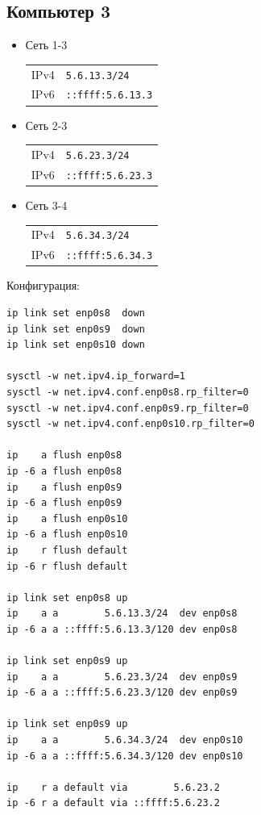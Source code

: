 \subsection{Компьютер 3}
\begin{itemize}
    \item Сеть 1-3

    \begin{tabular}{ll}
        IPv4 & \texttt{5.6.13.3/24}     \\
        IPv6 & \texttt{::ffff:5.6.13.3} \\
    \end{tabular}

    \item Сеть 2-3

    \begin{tabular}{ll}
        IPv4 & \texttt{5.6.23.3/24}     \\
        IPv6 & \texttt{::ffff:5.6.23.3} \\
    \end{tabular}

    \item Сеть 3-4

    \begin{tabular}{ll}
        IPv4 & \texttt{5.6.34.3/24}     \\
        IPv6 & \texttt{::ffff:5.6.34.3} \\
    \end{tabular}
\end{itemize}

Конфигурация:
\begin{verbatim}
ip link set enp0s8  down
ip link set enp0s9  down
ip link set enp0s10 down

sysctl -w net.ipv4.ip_forward=1
sysctl -w net.ipv4.conf.enp0s8.rp_filter=0
sysctl -w net.ipv4.conf.enp0s9.rp_filter=0
sysctl -w net.ipv4.conf.enp0s10.rp_filter=0

ip    a flush enp0s8
ip -6 a flush enp0s8
ip    a flush enp0s9
ip -6 a flush enp0s9
ip    a flush enp0s10
ip -6 a flush enp0s10
ip    r flush default
ip -6 r flush default

ip link set enp0s8 up
ip    a a        5.6.13.3/24  dev enp0s8
ip -6 a a ::ffff:5.6.13.3/120 dev enp0s8

ip link set enp0s9 up
ip    a a        5.6.23.3/24  dev enp0s9
ip -6 a a ::ffff:5.6.23.3/120 dev enp0s9

ip link set enp0s9 up
ip    a a        5.6.34.3/24  dev enp0s10
ip -6 a a ::ffff:5.6.34.3/120 dev enp0s10

ip    r a default via        5.6.23.2
ip -6 r a default via ::ffff:5.6.23.2
\end{verbatim}

